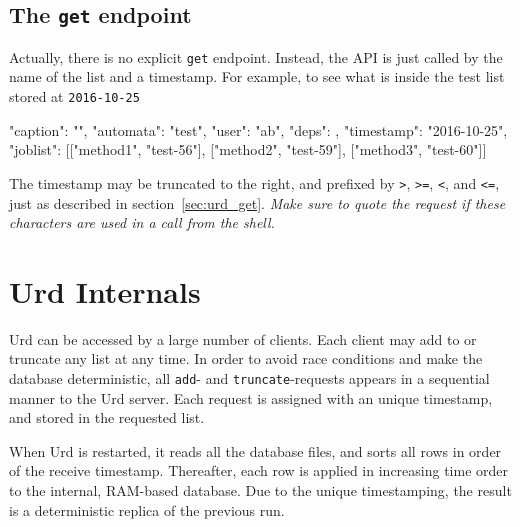 \subsection{The \texttt{get} endpoint}
Actually, there is no explicit \texttt{get} endpoint.  Instead, the
API is just called by the name of the list and a timestamp.  For
example, to see what is inside the test list stored
at \texttt{2016-10-25}
\begin{shell}
{"caption": "", "automata": "test", "user": "ab", "deps": {},
  "timestamp": "2016-10-25", "joblist": [["method1", "test-56"],
  ["method2", "test-59"], ["method3", "test-60"]]}
\end{shell}
The timestamp may be truncated to the right, and prefixed
by \texttt{>}, \texttt{>=}, \texttt{<}, and \texttt{<=}, just as
described in section~\ref{sec:urd_get}.  \textsl{Make sure to quote
the request if these characters are used in a call from the shell.}



\section{Urd Internals}
Urd can be accessed by a large number of clients.  Each client may add
to or truncate any list at any time.  In order to avoid race
conditions and make the database deterministic, all \texttt{add}-
and \texttt{truncate}-requests appears in a sequential manner to the
Urd server.  Each request is assigned with an unique timestamp, and
stored in the requested list.

When Urd is restarted, it reads all the database files, and sorts all
rows in order of the receive timestamp.  Thereafter, each row is
applied in increasing time order to the internal, RAM-based database.
Due to the unique timestamping, the result is a deterministic replica
of the previous run.
